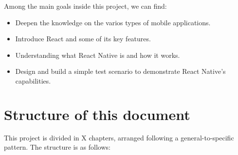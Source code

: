 Among the main goals inside this project, we can find:

\begin{itemize}  
	\item Deepen the knowledge on the varios types of mobile applications.
	\item Introduce React and some of its key features.
	\item Understanding what React Native is and how it works.
	\item Design and build a simple test scenario to demonstrate React Native's capabilities.
\end{itemize}

\section{Structure of this document}

This project is divided in X chapters, arranged following a general-to-specific pattern. The structure is as follows:

